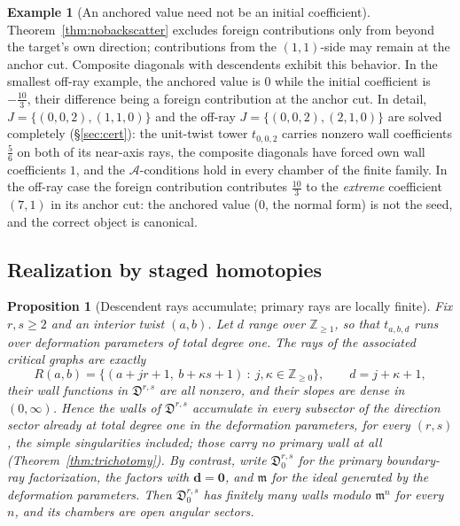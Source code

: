 \documentclass[11pt]{amsart}
\newtheorem{proposition}[theorem]{Proposition}
\theoremstyle{definition}
\newtheorem{example}[theorem]{Example}
\theoremstyle{remark}
\newcommand{\ZZ}{\mathbb{Z}}
\newcommand{\Dscr}{\mathfrak{D}}
\newcommand{\Ascr}{\mathcal{A}}
\begin{document}
\begin{example}[An anchored value need not be an initial coefficient]
\label{ex:farside}
Theorem~\ref{thm:nobackscatter} excludes foreign contributions only from beyond
the target's own direction; contributions from the $(1,1)$-side may remain at
the anchor cut.  Composite diagonals with descendents exhibit this behavior.
In the smallest off-ray example, the anchored value is $0$ while the initial
coefficient is $-\tfrac{10}{3}$, their difference being a foreign contribution
at the anchor cut.  In detail,
$J=\{(0,0,2),(1,1,0)\}$ and the off-ray $J=\{(0,0,2),(2,1,0)\}$ are solved
completely (\S\ref{sec:cert}): the
unit-twist tower $t_{0,0,2}$ carries nonzero wall coefficients $\tfrac56$ on both
of its near-axis rays,
the composite diagonals have forced own wall coefficients $1$, and the
$\Ascr$-conditions hold in every chamber of the finite family. In the off-ray case the foreign contribution
contributes $\tfrac{10}{3}$ to the \emph{extreme} coefficient $(7,1)$ in its
anchor cut: the anchored value ($0$, the normal form) is not the seed, and
the correct object is canonical.
\end{example}


\subsection{Realization by staged homotopies}
\label{ssec:realization}

\begin{proposition}[Descendent rays accumulate; primary rays are locally finite]
\label{prop:localfinite}
Fix $r,s\ge2$ and an interior twist $(a,b)$. Let $d$ range over $\ZZ_{\ge1}$, so that $t_{a,b,d}$ runs over deformation
parameters of total degree one. The rays of the associated critical graphs are
exactly
\[
R(a,b)=\bigl\{(a+jr+1,\ b+\kappa s+1)\ :\ j,\kappa\in\ZZ_{\ge0}\bigr\},
\qquad d=j+\kappa+1,
\]
their wall functions in $\Dscr^{r,s}$ are all nonzero, and their slopes are dense
in $(0,\infty)$. Hence the walls of $\Dscr^{r,s}$
accumulate in every subsector of the direction sector already at total degree one
in the deformation parameters, for every $(r,s)$, the simple singularities
included; those carry no primary wall at all (Theorem~\ref{thm:trichotomy}). By contrast, write
$\Dscr^{r,s}_{0}$ for the \emph{primary boundary-ray factorization}, the factors with
$\mathbf d=\mathbf 0$, and $\mathfrak m$ for the ideal generated by the
deformation parameters. Then $\Dscr^{r,s}_{0}$ has finitely many walls modulo
$\mathfrak m^{n}$ for every $n$, and its chambers are open angular sectors.
\end{proposition}
\end{document}
